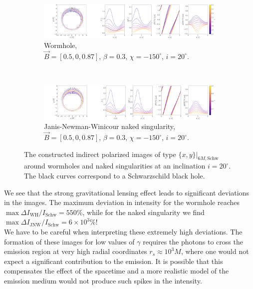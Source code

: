 \documentclass[12pt]{article}
\numberwithin{equation}{section}
\numberwithin{figure}{section}
\begin{document}
	\begin{figure}[!htb]
		\begin{subfigure}{16cm}
			\hspace{-1.0em}
			\includegraphics[scale = 0.15]{Section_7_Polarized_Emission/WH_delta_fig_B_0.5_0.87_0_20_deg_r6_n1.png}
			\caption{Wormhole,\\ $\vec{B} = [0.5, 0, 0.87]$, $\beta = 0.3$, $\chi = -150^\circ$, $i = 20^\circ$.} 
		\end{subfigure}\\
		\begin{subfigure}{17cm}
			\hspace{-1.0em}
			\includegraphics[scale = 0.15]{Section_7_Polarized_Emission/JNW_delta_fig_B_0.5_0.87_0_20_deg_r6_n1.png}
			\caption{Janis-Newman-Winicour naked singularity,\\  $\vec{B} = [0.5, 0, 0.87]$, $\beta = 0.3$, $\chi = -150^\circ$, $i = 20^\circ$.}
		\end{subfigure}
		\caption[The polarized indirect images around wormholes and naked singularities for an equatorial magnetic field at $i = 20^\circ$.]{\small The constructed indirect polarized images of type $\{x,y\}\vert_{6M, \text{Schw}}$ around wormholes and naked singularities at an inclination $i = 20^\circ$. The black curves correspond to a Schwarzschild black hole.} 
		\label{Inirect_image_deltas_20}
	\end{figure}
	
	We see that the strong gravitational lensing effect leads to significant deviations in the images. The maximum deviation in intensity for the wormhole reaches $\max \Delta I_\text{WH} / I_{\text{Schw}} = 550\%$, while for the naked singularity we find$\max \Delta I_\text{JNW} / I_{\text{Schw}} = 6\times10^3\%$!\\
	
	We have to be careful when interpreting these extremely high deviations. The formation of these images for low values of $\gamma$ requires the photons to cross the emission region at very high radial coordinates $r_s\approx 10^3M$, where one would not expect a significant contribution to the emission. It is possible that this compensates the effect of the spacetime and a more realistic model of the emission medium would not produce such spikes in the intensity.\\
	
\end{document}
